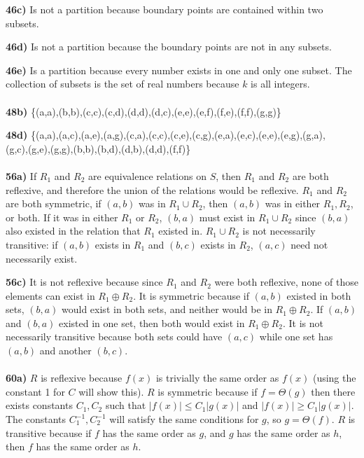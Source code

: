 \documentclass{article}
\begin{document}
\noindent\textbf{46c)} Is not a partition because boundary points are contained within two subsets. 

\noindent\textbf{46d)}  Is not a partition because the boundary points are not in any subsets.

\noindent\textbf{46e)}  Is a partition because every number exists in one and only one subset. The collection of subsets is the set of real numbers because $k$ is all integers.
\\\\
\noindent\textbf{48b)} \{(a,a),(b,b),(c,c),(c,d),(d,d),(d,c),(e,e),(e,f),(f,e),(f,f),(g,g)\}

\noindent\textbf{48d)}  \{(a,a),(a,c),(a,e),(a,g),(c,a),(c,c),(c,e),(c,g),(e,a),(e,c),(e,e),(e,g),(g,a), \\(g,c),(g,e),(g,g),(b,b),(b,d),(d,b),(d,d),(f,f)\}
\\\\
\noindent\textbf{56a)} If $R_1$ and $R_2$ are equivalence relations on $S$, then $R_1$ and $R_2$ are both reflexive, and therefore the union of the relations would be reflexive. $R_1$ and $R_2$ are both symmetric, if $(a,b)$ was in $R_1 \cup R_2$, then $(a,b)$ was in either $R_1, R_2$, or both. If it was in either $R_1$ or $R_2$, $(b,a)$ must exist in $R_1 \cup R_2$ since $(b,a)$ also existed in the relation that $R_1$ existed in. $R_1 \cup R_2$ is not necessarily transitive: if $(a,b)$ exists in $R_1$ and $(b,c)$ exists in $R_2$, $(a,c)$ need not necessarily exist. 

\noindent\textbf{56c)}  It is not reflexive because since $R_1$ and $R_2$ were both reflexive, none of those elements can exist in $R_1 \oplus R_2$. It is symmetric because if $(a,b)$ existed in both sets, $(b,a)$ would exist in both sets, and neither would be in $R_1 \oplus R_2$. If $(a,b)$ and $(b,a)$ existed in one set, then both would exist in $R_1 \oplus R_2$. It is not necessarily transitive because both sets could have $(a,c)$ while one set has $(a,b)$ and another $(b,c)$. 
\\\\
\noindent\textbf{60a)} $R$ is reflexive because $f(x)$ is trivially the same order as $f(x)$ (using the constant 1 for $C$ will show this). $R$ is symmetric because if $f = \Theta(g)$ then there exists constants $C_1, C_2$ such that $|f(x)|\le C_1|g(x)|$ and $|f(x)|\ge C_1|g(x)|$. The constants $C_1^{-1}, C_2^{-1}$ will satisfy the same conditions for $g$, so $g = \Theta(f)$. $R$ is transitive because if $f$ has the same order as $g$, and $g$ has the same order as $h$, then $f$ has the same order as $h$. 
\end{document}
